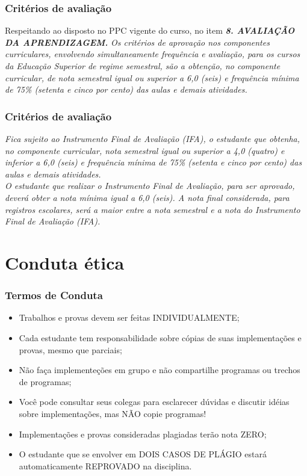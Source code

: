 \documentclass{beamer}
\begin{document}
\begin{frame}[fragile]\justifying
      \frametitle{Critérios de avaliação}
      Respeitando ao disposto no PPC vigente do curso, no item \textbf{\textit{8. AVALIAÇÃO DA APRENDIZAGEM. }}
      \newline
      \newline
      \textit{Os critérios de aprovação nos componentes curriculares, envolvendo simultaneamente frequência e avaliação, para os cursos da Educação Superior de 
      regime semestral, são a obtenção, no componente curricular, de nota semestral igual ou superior a 6,0 (seis) e frequência mínima de 75\% (setenta e cinco por cento) das
      aulas e demais atividades. }
\end{frame}

\begin{frame}[fragile]\justifying
      \frametitle{Critérios de avaliação}
      \textit{Fica sujeito ao Instrumento Final de Avaliação (IFA), o estudante que obtenha, no componente curricular, nota semestral igual ou superior a
      4,0 (quatro) e inferior a 6,0 (seis) e frequência mínima de 75\% (setenta e cinco por cento) das aulas e demais atividades. \\ O estudante que realizar o Instrumento Final de
      Avaliação, para ser aprovado, deverá obter a nota mínima igual a 6,0 (seis). A nota final considerada, para registros escolares, será a maior entre a nota semestral e a nota do
      Instrumento Final de Avaliação (IFA). }
      \newline
\end{frame}

\section{Conduta ética}
\begin{frame}
\frametitle{Termos de Conduta}
      \begin{itemize}
            \item Trabalhos e provas devem ser feitas INDIVIDUALMENTE;
            \item Cada estudante tem responsabilidade sobre cópias de suas implementações e provas, mesmo que parciais;
            \item Não faça implementeções em grupo e não compartilhe programas ou trechos de programas;
            \item Você pode consultar seus colegas para esclarecer dúvidas e discutir idéias sobre implementações, mas NÃO copie programas!
            \item Implementações e provas consideradas plagiadas terão nota ZERO;
            \item O estudante que se envolver em DOIS CASOS DE PLÁGIO estará automaticamente REPROVADO na disciplina.
      \end{itemize}
\end{frame}
\end{document}
